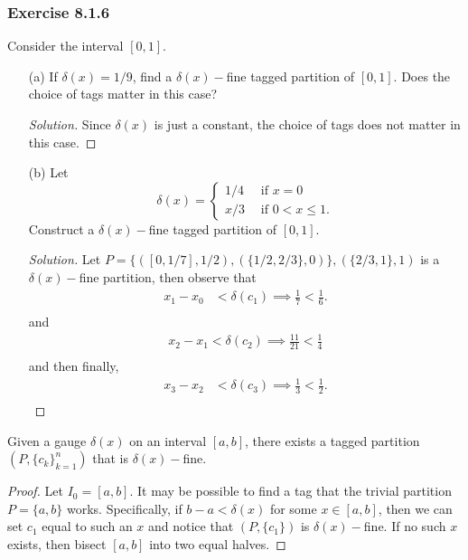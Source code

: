 \subsubsection{Exercise 8.1.6} Consider the interval \( [0,1]  \). 
\begin{enumerate}
    \item[(a)] If \( \delta(x) = 1/ 9 \), find a \( \delta(x)-\)fine tagged partition of \( [0,1]  \). Does the choice of tags matter in this case? 
        \begin{proof}[Solution]
        Since \( \delta(x) \) is just a constant, the choice of tags does not matter in this case.
        \end{proof}
    \item[(b)] Let 
        \[ \delta(x) = 
        \begin{cases}
            1/4 \ &\text{ if } x = 0 \\
            x/3  &\text{ if  } 0  < x \leq 1.
        \end{cases}  \]
        Construct a \( \delta(x)- \)fine tagged partition of \( [0,1] \).  
    \begin{proof}[Solution]
        Let \( P = \{ ([0, 1/7], 1/2), (\{ 1/2, 2/3 \}, 0 ) \}, (\{ 2/3, 1 \}, 1) \) is a \( \delta(x)- \)fine partition, then observe that 
        \begin{align*}
            x_{1} - x_{0} &< \delta(c_{1}) \implies \frac{ 1 }{ 7 } < \frac{ 1 }{ 6 }. \\
        \end{align*}
        and 
        \begin{align*}
            x_{2} - x_{1} < \delta(c_{2}) \implies \frac{ 11 }{ 21 } < \frac{ 1 }{ 4 } \\
        \end{align*}
        and then finally, 
        \begin{align*}
            x_{3} - x_{2} &< \delta(c_{3}) \implies \frac{ 1 }{ 3 } < \frac{ 1 }{ 2 }. \\
        \end{align*}

    \end{proof}
\end{enumerate}

\begin{theorem}{}{}
    Given a gauge \( \delta(x)  \) on an interval \( [a,b]  \), there exists a tagged partition \( (P, \{ c_{k }  \}_{k=1}^{n}) \) that is \( \delta(x)- \)fine.
\end{theorem}
\begin{proof}
    Let \( I_{0} = [a,b]  \). It may be possible to find a tag that the trivial partition \( P = \{ a,b  \}  \) works. Specifically, if \( b-a < \delta(x)  \) for some \( x \in [a,b]  \), then we can set \( c_{1} \) equal to such an \( x  \) and notice that \( (P, \{ c_{1} \} ) \) is \( \delta(x)-\)fine. If no such \( x  \) exists, then bisect \( [a,b] \) into two equal halves.
\end{proof}


